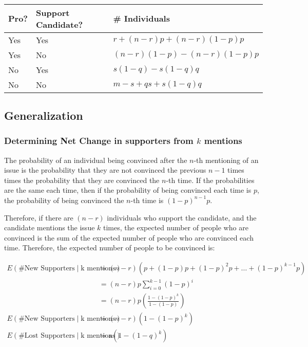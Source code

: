 \documentclass{article}
\begin{document}
\paragraph{}
\begin{tabular}{|l|l|l|}
\hline
Pro? & Support Candidate? & \# Individuals\\
\hline
Yes & Yes & $r + (n - r) p + (n-r)(1-p)p$ \\
Yes & No & $(n-r)(1-p) - (n-r)(1-p)p$ \\
No & Yes & $s(1 - q) - s(1-q)q$ \\
No & No & $m-s + q s + s(1-q)q$ \\
\hline
\end{tabular}

\subsection{Generalization}

\subsubsection{Determining Net Change in supporters from $k$ mentions}

The probability of an individual being convinced after the $n$-th
	mentioning of an issue is the probability that they are not
	convinced the previous $n-1$ times times the probability that
	they are convinced the $n$-th time.
If the probabilities are the same each time, then if the probability
	of being convinced each time is $p$, the probability of being
	convinced the $n$-th time is $(1-p)^{n-1}p$.

Therefore, if there are $(n-r)$ individuals who support the candidate,
	and the candidate mentions the issue $k$ times,
	the expected number of people who are convinced is the sum of the
	expected number of people who are convinced each time.
Therefore, the expected number of people to be convinced is:

\begin{align*}
E\left( \text{\# New Supporters} \mid \text{k mentions} \right)
	& = (n - r) \left( p + (1 - p) p + (1 - p)^2 p + \dots + (1 - p)^{k-1} p \right)\\
	& = (n - r) p \sum_{i=0}^{k-1} ( 1 - p )^i \\
	& = (n - r) p \left( \frac{1 - (1 - p)^k}{1 - (1 - p)} \right) \\
E\left( \text{\# New Supporters} \mid \text{k mentions} \right)
	& = (n - r) \left( 1 - (1 - p)^k \right)\\
E\left( \text{\# Lost Supporters} \mid \text{k mentions} \right)
	& = s \left( 1 - (1 - q)^k \right)\\
\end{align*}
\end{document}
